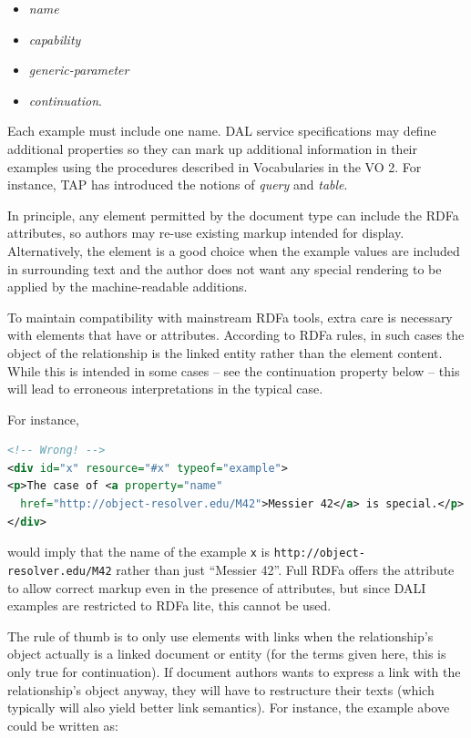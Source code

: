 \documentclass[11pt,letter]{ivoa}
\begin{document}
\begin{itemize}
\item \emph{name}
\item \emph{capability}
\item \emph{generic-parameter}
\item \emph{continuation}.
\end{itemize}

Each example must include one
name.  DAL service specifications may define additional
properties so they can mark up additional information in their examples
using the procedures described in Vocabularies in the VO 2.  For
instance, TAP has introduced the notions of \emph{query} and \emph{table}.

In principle, any element permitted by the document type can include the RDFa
attributes, so authors may re-use existing markup intended for display.
Alternatively, the  element is a good choice when the example values are
included in surrounding text and the author does not want any special rendering
to be applied by the machine-readable additions.

To maintain compatibility with mainstream RDFa tools, extra care is
necessary with elements that have  or 
attributes.  According to RDFa rules, in such cases the object of the
relationship is the linked entity rather than the element content.
While this is intended in some cases -- see the continuation property
below -- this will lead to erroneous interpretations in the typical
case.

For instance,

\begin{lstlisting}[language=XML]
<!-- Wrong! -->
<div id="x" resource="#x" typeof="example">
<p>The case of <a property="name"
  href="http://object-resolver.edu/M42">Messier 42</a> is special.</p>
</div>
\end{lstlisting}

would imply that the name of the example \texttt{x} is
\nolinkurl{http://object-resolver.edu/M42} rather than just ``Messier
42''.  Full RDFa offers the  attribute to allow correct
markup even in the presence of  attributes, but since DALI
examples are restricted to RDFa lite, this cannot be used.

The rule of thumb is to only use elements with links when the
relationship's object actually is a linked document or entity (for the
terms given here, this is only true for continuation).  If document
authors wants to express a link with the relationship's object anyway,
they will have to restructure their texts (which typically will also
yield better link semantics).  For instance, the example above could be
written as:
\end{document}
